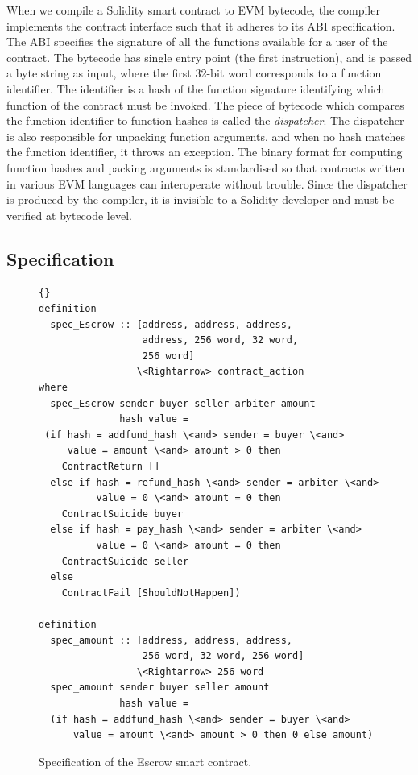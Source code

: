 \documentclass[sigplan,10pt]{acmart}\settopmatter{printfolios=true,printccs=false,printacmref=false}
\begin{document}
When we compile a Solidity smart contract to EVM bytecode,
the compiler implements the contract interface
such that it adheres to its ABI specification.
The ABI specifies the signature of all the functions
available for a user of the contract.
The bytecode has single entry point (the first instruction),
and is passed a byte string as input, where the
first 32-bit word corresponds to a function identifier.
The identifier is a hash of the function signature
identifying which function of the contract must be invoked.
The piece of bytecode which compares the function identifier
to function hashes is called the \textit{dispatcher}.
The dispatcher is also responsible for unpacking function
arguments, and when no hash matches the function identifier,
it throws an exception.
The binary format for computing function hashes and
packing arguments is standardised so that contracts
written in various EVM languages can interoperate without
trouble.
Since the dispatcher is produced by the compiler, it is
invisible to a Solidity developer and must be verified at
bytecode level.

\subsection{Specification}
\label{sec:spec}

\begin{figure}[h]
\begin{lstlisting}[language=Isar]{}
definition 
  spec_Escrow :: [address, address, address,
                  address, 256 word, 32 word,
                  256 word]
                 \<Rightarrow> contract_action
where
  spec_Escrow sender buyer seller arbiter amount
              hash value = 
 (if hash = addfund_hash \<and> sender = buyer \<and>
     value = amount \<and> amount > 0 then
    ContractReturn []
  else if hash = refund_hash \<and> sender = arbiter \<and>
          value = 0 \<and> amount = 0 then
    ContractSuicide buyer
  else if hash = pay_hash \<and> sender = arbiter \<and>
          value = 0 \<and> amount = 0 then
    ContractSuicide seller
  else
    ContractFail [ShouldNotHappen])

definition
  spec_amount :: [address, address, address,
                  256 word, 32 word, 256 word]
                 \<Rightarrow> 256 word
  spec_amount sender buyer seller amount
              hash value =
  (if hash = addfund_hash \<and> sender = buyer \<and>
      value = amount \<and> amount > 0 then 0 else amount)
\end{lstlisting}
\caption{Specification of the Escrow smart contract.}
\label{spec}
\end{figure}
\end{document}
